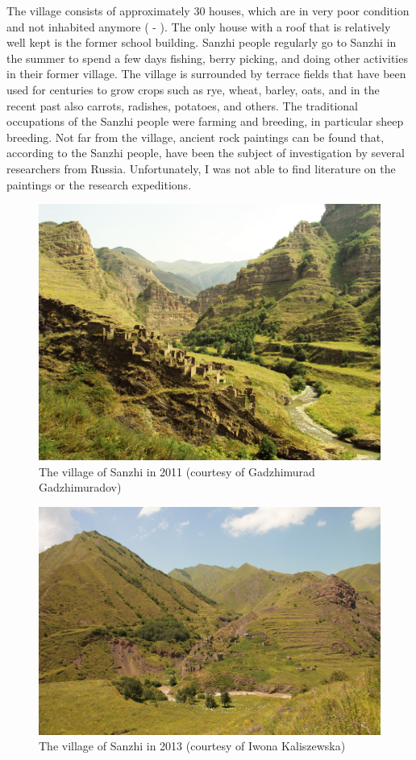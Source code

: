The village consists of approximately 30 houses, which are in very poor condition and not inhabited anymore ( - ). The only house with a roof that is relatively well kept is the former school building. Sanzhi people regularly go to Sanzhi in the summer to spend a few days fishing, berry picking, and doing other activities in their former village. The village is surrounded by terrace fields that have been used for centuries to grow crops such as rye, wheat, barley, oats, and in the recent past also carrots, radishes, potatoes, and others. The traditional occupations of the Sanzhi people were farming and breeding, in particular sheep breeding. Not far from the village, ancient rock paintings can be found that, according to the Sanzhi people, have been the subject of investigation by several researchers from Russia. Unfortunately, I was not able to find literature on the paintings or the research expeditions.

\begin{figure}
	\caption{The village of Sanzhi in 2011 (courtesy of Gadzhimurad Gadzhimuradov)}
	\label{fig:Sanzhi 1}
	\includegraphics[scale=0.4]{figures/Sanzhi_1.png}
\end{figure}

\begin{figure}
	\caption{The village of Sanzhi in 2013 (courtesy of Iwona Kaliszewska)}
	\label{fig:Sanzhi 2}
	\includegraphics[scale=0.5]{figures/Sanzhi_2.png}
\end{figure}

